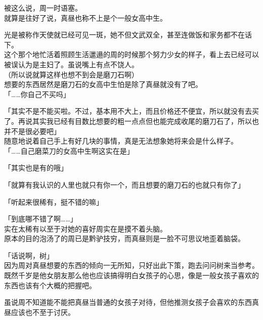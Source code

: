 被这么说，周一时语塞。\\

就算是往好了说，真昼也称不上是个一般女高中生。

光是被称作天使就已经可见一斑，她不但文武双全，甚至连做饭和家务都不在话下。\\

这个那个地忙活着照顾生活邋遢的周的时候那个努力少女的样子，看上去已经可以被误认为是主妇了。虽说嘴上有点不饶人。\\

（所以说就算这样也想不到会是磨刀石啊）\\

想要的东西居然是磨刀石的女高中生怕是除了真昼就没有了吧。\\

「……你自己不买吗」

「其实不是不能买啦。不过，基本用不大上，而且价格还不便宜，所以就没有去买了。再说其实我已经有目数比想要的粗一点点但也能完成收尾的磨刀石了，所以也并不是很必要吧」\\

随意地说着自己手上有好几块的事情，真是无法想象她将来会是什么样子。\\

「……自己磨菜刀的女高中生啊这实在是」

「其实也是有的哦」

「就算有我认识的人里也就只有你一个，而且想要的磨刀石的也就只有你了」

「听起来很稀有，挺不错的嘛」

「到底哪不错了啊……」\\

实在太稀有以至于对她的喜好周实在是摸不着头脑。\\

原本的目的泡汤了的周已是黔驴技穷，而真昼则是一脸不可思议地歪着脑袋。\\

\vspace{2\baselineskip}

「话说啊，树」\\

因为周对真昼想要的东西的倾向一无所知，只好出此下策，跑去问问树来当参考。\\

既然千岁是他女朋友那么他也应该搞得明白女孩子的心思，像是一般女孩子喜欢的东西也该有个大概的把握吧。

虽说周不知道能不能把真昼当普通的女孩子对待，但他推测女孩子会喜欢的东西真昼应该也不至于讨厌。\\

